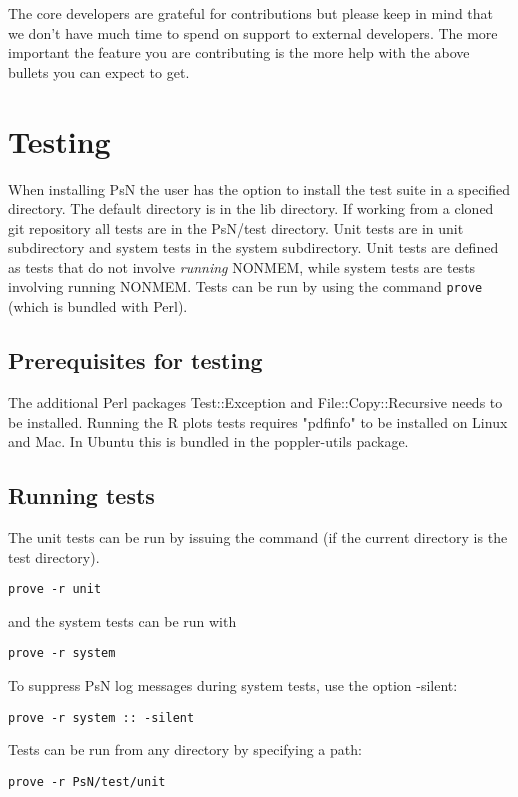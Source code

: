 The core developers are grateful for contributions but please keep in mind that we don't have much time to spend on support to external developers.
The more important the feature you are contributing is the more help with the above bullets you can expect to get.


\section{Testing}
When installing PsN the user has the option to install the test suite in a specified directory. The default directory is in the lib directory. If working from a cloned git repository all tests are in the PsN/test directory. Unit tests are in unit subdirectory and system tests in the system subdirectory.
Unit tests are defined as tests that do not involve \emph{running} NONMEM, while system tests are tests involving running NONMEM.
Tests can be run by using the command \verb|prove| (which is bundled with Perl).

\subsection{Prerequisites for testing}
The additional Perl packages Test::Exception and File::Copy::Recursive needs to be installed.
Running the R plots tests requires "pdfinfo" to be installed on Linux and Mac. In Ubuntu this is bundled in the poppler-utils package.

\subsection{Running tests}
The unit tests can be run by issuing the command (if the current directory is the test directory).
\begin{verbatim}
prove -r unit
\end{verbatim}

and the system tests can be run with
\begin{verbatim}
prove -r system
\end{verbatim}

To suppress PsN log messages during system tests, use the option -silent:
\begin{verbatim}
prove -r system :: -silent
\end{verbatim}

Tests can be run from any directory by specifying a path:
\begin{verbatim}
prove -r PsN/test/unit
\end{verbatim}

